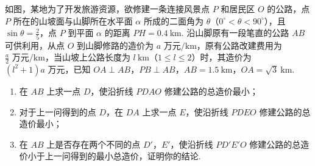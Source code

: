 \begin{problem}
如图，某地为了开发旅游资源，欲修建一条连接风景点 \(P\) 和居民区 \(O\) 的公路，点 \(P\) 所在的山坡面与山脚所在水平面 \(\alpha\) 所成的二面角为 \(\theta\)（\(0^{\circ} < \theta < 90^{\circ}\)），且 \(\sin \theta = \frac{2}{5}\)，点 \(P\) 到平面 \(\alpha\) 的距离 \(PH = 0.4\mathrm{~km}\). 沿山脚原有一段笔直的公路 \(AB\) 可供利用，从点 \(O\) 到山脚修路的造价为 \(a\text{ 万元}/\mathrm{km}\)，原有公路改建费用为 \(\frac{a}{2}\text{ 万元}/\mathrm{km}\)，当山坡上公路长度为 \(l\mathrm{~km}\)（\(1 \leqslant l \leqslant 2\)）时，其造价为 \((l^{2} + 1)a\text{ 万元}\)，已知 \(OA \perp AB\)，\(PB \perp AB\)，\(AB = 1.5\mathrm{~km}\)，\(OA = \sqrt{3}\mathrm{~km}\).

\begin{enumerate}
\item 在 \(AB\) 上求一点 \(D\)，使沿折线 \(PDAO\) 修建公路的总造价最小；
\item 对于上一问得到的点 \(D\)，在 \(DA\) 上求一点 \(E\)，使沿折线 \(PDEO\) 修建公路的总造价最小；
\item 在 \(AB\) 上是否存在两个不同的点 \(D'\)，\(E'\)，使沿折线 \(PD'E'O\) 修建公路的总造价小于上一问得到的最小总造价，证明你的结论.
\end{enumerate}
\end{problem}


